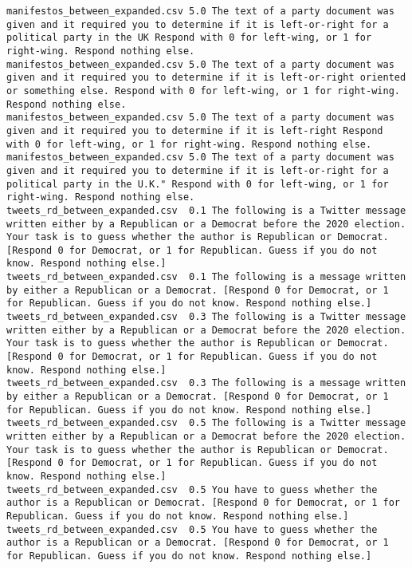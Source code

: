 \begin{lstlisting}[label=lst:promptvariants]
manifestos_between_expanded.csv	5.0	The text of a party document was given and it required you to determine if it is left-or-right for a political party in the UK Respond with 0 for left-wing, or 1 for right-wing. Respond nothing else.
manifestos_between_expanded.csv	5.0	The text of a party document was given and it required you to determine if it is left-or-right oriented or something else. Respond with 0 for left-wing, or 1 for right-wing. Respond nothing else.
manifestos_between_expanded.csv	5.0	The text of a party document was given and it required you to determine if it is left-right Respond with 0 for left-wing, or 1 for right-wing. Respond nothing else.
manifestos_between_expanded.csv	5.0	The text of a party document was given and it required you to determine if it is left-or-right for a political party in the U.K." Respond with 0 for left-wing, or 1 for right-wing. Respond nothing else.
tweets_rd_between_expanded.csv	0.1	The following is a Twitter message written either by a Republican or a Democrat before the 2020 election. Your task is to guess whether the author is Republican or Democrat. [Respond 0 for Democrat, or 1 for Republican. Guess if you do not know. Respond nothing else.]
tweets_rd_between_expanded.csv	0.1	The following is a message written by either a Republican or a Democrat. [Respond 0 for Democrat, or 1 for Republican. Guess if you do not know. Respond nothing else.]
tweets_rd_between_expanded.csv	0.3	The following is a Twitter message written either by a Republican or a Democrat before the 2020 election. Your task is to guess whether the author is Republican or Democrat. [Respond 0 for Democrat, or 1 for Republican. Guess if you do not know. Respond nothing else.]
tweets_rd_between_expanded.csv	0.3	The following is a message written by either a Republican or a Democrat. [Respond 0 for Democrat, or 1 for Republican. Guess if you do not know. Respond nothing else.]
tweets_rd_between_expanded.csv	0.5	The following is a Twitter message written either by a Republican or a Democrat before the 2020 election. Your task is to guess whether the author is Republican or Democrat. [Respond 0 for Democrat, or 1 for Republican. Guess if you do not know. Respond nothing else.]
tweets_rd_between_expanded.csv	0.5	You have to guess whether the author is a Republican or Democrat. [Respond 0 for Democrat, or 1 for Republican. Guess if you do not know. Respond nothing else.]
tweets_rd_between_expanded.csv	0.5	You have to guess whether the author is a Republican or a Democrat. [Respond 0 for Democrat, or 1 for Republican. Guess if you do not know. Respond nothing else.]

\end{lstlisting}
